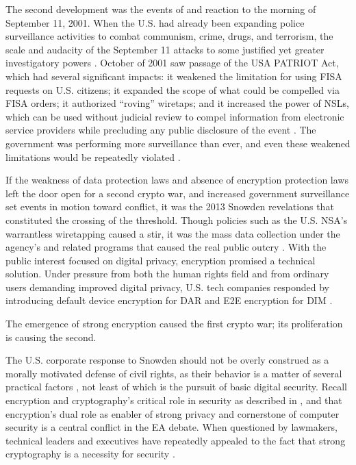 The second development was the events of and reaction to the morning of September 11, 2001. When the U.S. had already
been expanding police surveillance activities to combat communism, crime, drugs, and terrorism, the scale and audacity
of the September 11 attacks to some justified yet greater investigatory powers \cite{bloss_escalating_2007}. October of
2001 saw passage of the USA PATRIOT Act, which had several significant impacts: it weakened the limitation for using
\ac{FISA} requests on U.S. citizens; it expanded the scope of what could be compelled via \ac{FISA} orders; it
authorized ``roving'' wiretaps; and it increased the power of \acp{NSL}, which can be used without judicial review
to compel information from electronic service providers while precluding any public disclosure of the event
\cite{sensenbrenner_2001} \cite{shamsi_2011}. The government was performing more surveillance than ever, and even these
weakened limitations would be repeatedly violated \cite{shamsi_2011} \cite{tucker_2020}.

If the weakness of data protection laws and absence of encryption protection laws left the door open for a second crypto
war, and increased government surveillance set events in motion toward conflict, it was the 2013 Snowden revelations
that constituted the crossing of the threshold. Though policies such as the U.S. \ac{NSA}'s warrantless wiretapping
caused a stir, it was the mass data collection under the agency's  and related programs that caused the real
public outcry \cite{landau_making_2013}. With the public interest focused on digital privacy, encryption promised a
technical solution. Under pressure from both the human rights field and from ordinary users demanding improved digital
privacy, U.S. tech companies responded by introducing default device encryption for \ac{DAR} and \ac{E2E} encryption for
\ac{DIM} \cite{treguer_us_2018}.

The emergence of strong encryption caused the first crypto war; its proliferation is causing the second.

The U.S. corporate response to Snowden should not be overly construed as a morally motivated defense of civil rights, as
their behavior is a matter of several practical factors \cite{treguer_us_2018}, not least of which is the pursuit of
basic digital security. Recall encryption and cryptography's critical role in security as described in
, and that encryption's dual role as enabler of strong privacy and cornerstone of computer
security is a central conflict in the \ac{EA} debate. When questioned by lawmakers, technical leaders and executives
have repeatedly appealed to the fact that strong cryptography is a necessity for security \cite{schulze_clipper_2017}.

